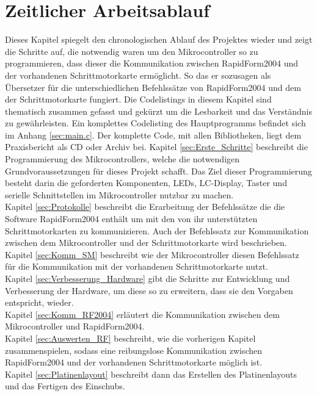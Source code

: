 \chapter{Zeitlicher Arbeitsablauf}
\label{cha:Arbeit}
Dieses Kapitel spiegelt den chronologischen Ablauf des Projektes wieder und zeigt die Schritte auf, die notwendig waren um den Mikrocontroller so zu programmieren, dass dieser die Kommunikation zwischen RapidForm2004 und der vorhandenen Schrittmotorkarte ermöglicht. So das er sozusagen als Übersetzer für die unterschiedlichen Befehlssätze von RapidForm2004 und dem der Schrittmotorkarte fungiert.
Die Codelistings in diesem Kapitel sind thematisch zusammen gefasst und gekürzt um die Lesbarkeit und das Verständnis zu gewährleisten. Ein komplettes Codelisting des Hauptprogramms befindet sich im Anhang \ref{sec:main.c}. Der komplette Code, mit allen Bibliotheken, liegt dem Praxisbericht als CD oder Archiv bei.
Kapitel \ref{sec:Erste_Schritte} beschreibt die Programmierung des Mikrocontrollers, welche die notwendigen Grundvoraussetzungen für dieses Projekt schafft. Das Ziel dieser Programmierung besteht darin die geforderten Komponenten, LEDs, LC-Display, Taster und serielle Schnittstellen im Mikrocontroller nutzbar zu machen.\\
Kapitel \ref{sec:Protokolle} beschreibt die Erarbeitung der Befehlssätze die die Software RapidForm2004 enthält um mit den von ihr unterstützten Schrittmotorkarten zu kommunizieren. Auch der Befehlssatz zur Kommunikation zwischen dem Mikrocontroller und der Schrittmotorkarte wird beschrieben.\\
Kapitel \ref{sec:Komm_SM} beschreibt wie der Mikrocontroller diesen Befehlssatz für die Kommunikation mit der vorhandenen Schrittmotorkarte nutzt.\\
Kapitel \ref{sec:Verbesserung_Hardware} gibt die Schritte zur Entwicklung und Verbesserung der Hardware, um diese so zu erweitern, dass sie den Vorgaben entspricht, wieder.\\
Kapitel \ref{sec:Komm_RF2004} erläutert die Kommunikation zwischen dem Mikrocontroller und RapidForm2004. \\
Kapitel \ref{sec:Auswerten_RF} beschreibt, wie die vorherigen Kapitel zusammenspielen, sodass eine reibungslose Kommunikation zwischen RapidForm2004 und der vorhandenen Schrittmotorkarte möglich ist.\\
Kapitel \ref{sec:Platinenlayout} beschreibt dann das Erstellen des Platinenlayouts und das Fertigen des Einschubs.

